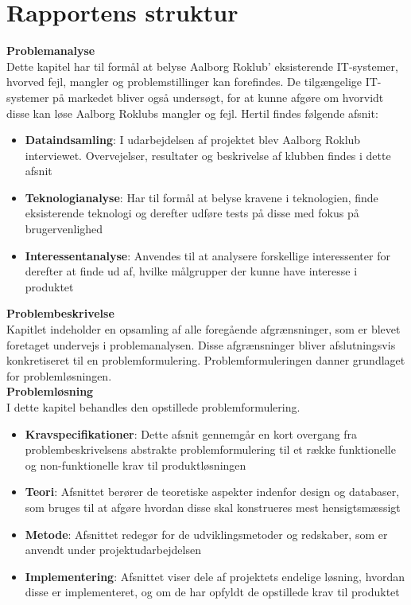 
\section{Rapportens struktur}


\textbf{Problemanalyse}\\
Dette kapitel har til formål at belyse Aalborg Roklub’ eksisterende IT-systemer, hvorved fejl, mangler og problemstillinger kan forefindes. De tilgængelige IT-systemer på markedet bliver også undersøgt, for at kunne afgøre om hvorvidt disse kan løse Aalborg Roklubs mangler og fejl. Hertil findes følgende afsnit:
    \begin{itemize}
    \item  \textbf{Dataindsamling}: I udarbejdelsen af projektet blev Aalborg Roklub interviewet. Overvejelser, resultater og beskrivelse af klubben findes i dette afsnit

    \item \textbf{Teknologianalyse}: Har til formål at belyse kravene i teknologien, finde eksisterende teknologi og derefter udføre tests på disse med fokus på brugervenlighed

    \item \textbf{Interessentanalyse}: Anvendes til at analysere forskellige interessenter for derefter at finde ud af, hvilke målgrupper der kunne have interesse i produktet
    \end{itemize}

\textbf{Problembeskrivelse}\\
Kapitlet indeholder en opsamling af alle foregående afgrænsninger, som er blevet foretaget undervejs i problemanalysen. Disse afgrænsninger bliver afslutningsvis konkretiseret til en problemformulering. Problemformuleringen danner grundlaget for problemløsningen. \\

\textbf{Problemløsning}\\
I dette kapitel behandles den opstillede problemformulering. 

    \begin{itemize}
    \item \textbf{Kravspecifikationer}: Dette afsnit gennemgår en kort overgang fra problembeskrivelsens abstrakte problemformulering til et række funktionelle og non-funktionelle krav til produktløsningen
    \item  \textbf{Teori}: Afsnittet berører de teoretiske aspekter indenfor design og databaser, som bruges til at afgøre hvordan disse skal konstrueres mest hensigtsmæssigt
    \item \textbf{Metode}: Afsnittet redegør for de udviklingsmetoder og redskaber, som er anvendt under projektudarbejdelsen
    \item \textbf{Implementering}: Afsnittet viser dele af projektets endelige løsning, hvordan disse er implementeret, og om de har opfyldt de opstillede krav til produktet
    \end{itemize}


